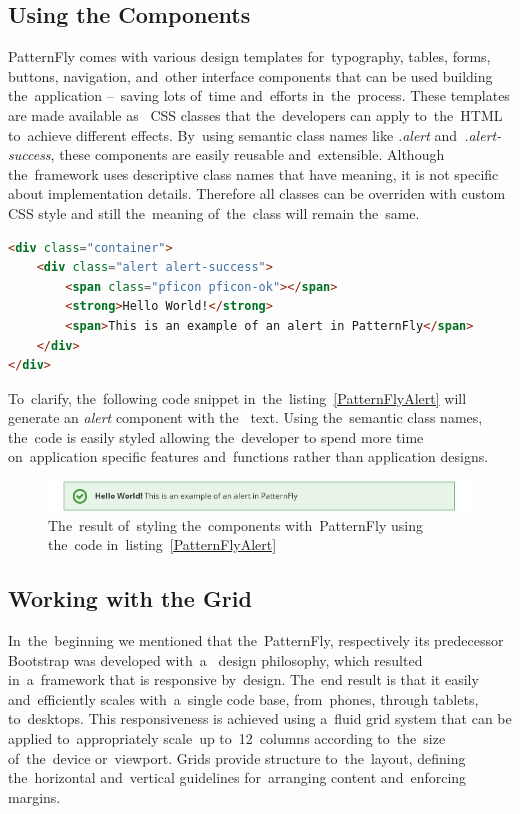 \subsection{Using the Components}
PatternFly comes with various design templates for~typography, tables, forms,
buttons, navigation, and~other interface components that can be used building
the~application --~saving lots of~time and~efforts in~the~process. These
templates are made available as~ CSS classes that
the~developers can apply to~the~HTML to~achieve different effects.
By~using semantic class names like \textit{.alert} and~\textit{.alert-success},
these components are easily reusable and~extensible. Although the~framework uses
descriptive class names that have meaning, it is not specific about
implementation details. Therefore all classes can be overriden with custom
CSS style and still the~meaning of~the~class will remain
the~same.

\vspace{2mm}
\begin{lstlisting}[caption=An~example of~\textit{alert} implemented using
the~PatternFly framework.,language=HTML,label=PatternFlyAlert]
<div class="container">
	<div class="alert alert-success">
		<span class="pficon pficon-ok"></span>
		<strong>Hello World!</strong>
		<span>This is an example of an alert in PatternFly</span>
	</div>
</div>
\end{lstlisting}

To~clarify, the~following code snippet in~the~listing~\ref{PatternFlyAlert} will
generate an \textit{alert} component with the~ text. Using
the~semantic class names, the~code is easily styled allowing the~developer to
spend more time on~application specific features and~functions rather than
application designs.

\begin{figure}[!hbt]
	\centering
	\includegraphics[scale=0.7]{./obrazky-figures/patternfly-components.png}
	\caption{The~result of~styling the~components with~PatternFly using the~code
	in~listing~\ref{PatternFlyAlert}}
	\label{PatternFlyComponents}
\end{figure}

\subsection{Working with the Grid}
In~the~beginning we mentioned that the~PatternFly, respectively its predecessor
Bootstrap was developed with~a~ design philosophy, which
resulted in~a~framework that is responsive by~design. The~end result is that it
easily and~efficiently scales with~a~single code base, from~phones, through
tablets, to~desktops. This responsiveness is achieved using a~fluid grid system
that can be applied to~appropriately scale~up to~12~columns according
to~the~size of~the~device or~viewport. Grids provide structure to~the~layout,
defining the~horizontal and~vertical guidelines for~arranging content
and~enforcing margins.

